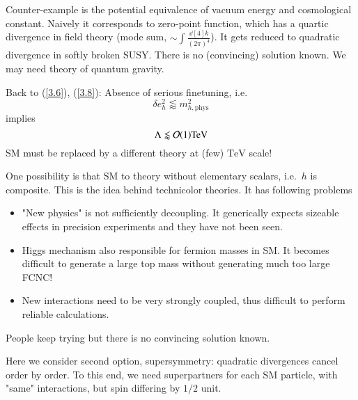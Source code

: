 Counter-example is the potential equivalence of vacuum energy and cosmological constant. Naively it corresponds to zero-point function, which has a quartic divergence in field theory (mode sum, $\sim \int \frac{\dd[4]{k}}{(2\pi)^4}$). It gets reduced to quadratic divergence in softly broken SUSY. There is no (convincing) solution known. We may need theory of quantum gravity. 

Back to (\ref{3.6}), (\ref{3.8}): Absence of serious finetuning, i.e.~
\begin{equation}
   \delta e_h^2 \lessapprox m_{h, \text{phys}}^2
   \label{3.9}
\end{equation}
implies
\begin{equation}
   \Lambda \lessapprox \order{1} \si{\tera \eV}
   \label{3.10}
\end{equation}
SM must be replaced by a different theory at (few) $\si{\tera\eV}$ scale!

One possibility is that SM to theory without elementary scalars, i.e.~$h$ is composite. This is the idea behind technicolor theories. It has following problems
\begin{itemize}
   \item "New physics" is not sufficiently decoupling. It generically expects sizeable effects in precision experiments and they have not been seen.
   \item Higgs mechanism also responsible for fermion masses in SM. It becomes difficult to generate a large top mass without generating much too large FCNC!
   \item New interactions need to be very strongly coupled, thus difficult to perform reliable calculations.
\end{itemize}
People keep trying but there is no convincing solution known.

Here we consider second option, supersymmetry: quadratic divergences cancel order by order. To this end, we need superpartners for each SM particle, with "same" interactions, but spin differing by $1/2$ unit.

